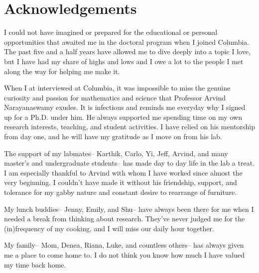 \cleartorecto %
\chapter{Acknowledgements} %
\thispagestyle{plain} %

I could not have imagined or prepared for the educational or personal opportunities that awaited me in the doctoral program when I joined Columbia. The past five and a half years have allowed me to dive deeply into a topic I love, but I have had my share of highs and lows and I owe a lot to the people I met along the way for helping me make it.

When I at interviewed at Columbia, it was impossible to miss the genuine curiosity and passion for mathematics and science that Professor Arvind Narayanaswamy exudes. It is infectious and reminds me everyday why I signed up for a Ph.D. under him. He always supported me spending time on my own research interests, teaching, and student activities. I have relied on his mentorship from day one, and he will have my gratitude as I move on from his lab.

The support of my labmates-- Karthik, Carlo, Yi, Jeff, Arvind, and many master's and undergraduate students-- has made day to day life in the lab a treat. I am especially thankful to Arvind with whom I have worked since almost the very beginning. I couldn't have made it without his friendship, support, and tolerance for my gabby nature and constant desire to rearrange of furniture. 

My lunch buddies-- Jenny, Emily, and Shu-- have always been there for me when I needed a break from thinking about research. They've never judged me for the (in)frequency of my cooking, and I will miss our daily hour together.

My family-- Mom, Denea, Riana, Luke, and countless others-- has always given me a place to come home to. I do not think you know how much I have valued my time back home.